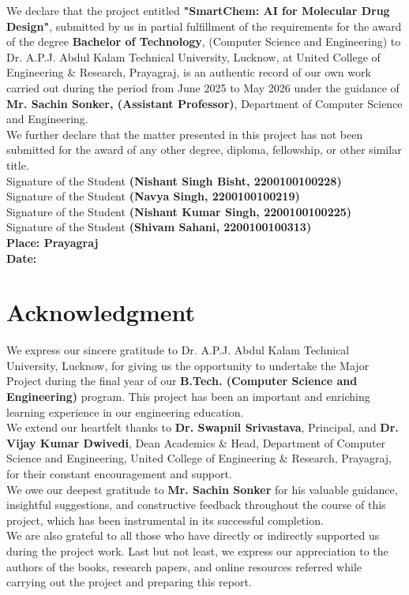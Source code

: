 \documentclass[12pt,a4paper]{report}
\begin{document}
We declare that the project entitled \textbf{"SmartChem: AI for Molecular Drug Design"}, submitted by us in partial fulfillment of the requirements for the award of the degree \textbf{Bachelor of Technology}, (Computer Science and Engineering) to Dr. A.P.J. Abdul Kalam Technical University, Lucknow, at United College of Engineering \& Research, Prayagraj, is an authentic record of our own work carried out during the period from June 2025 to May 2026 under the guidance of \textbf{Mr. Sachin Sonker, (Assistant Professor)}, Department of Computer Science and Engineering.\\[0.5cm] 
We further declare that the matter presented in this project has not been submitted for the award of any other degree, diploma, fellowship, or other similar title.\\[1cm]
Signature of the Student \textbf{(Nishant Singh Bisht, 2200100100228)}\\[0.8cm]Signature of the Student
\textbf{(Navya Singh, 2200100100219)}\\[0.8cm]Signature of the Student \textbf{(Nishant Kumar Singh, 2200100100225)}\\[0.8cm]Signature of the Student \textbf{(Shivam Sahani, 2200100100313)}\\[4cm]\textbf{Place: Prayagraj\\Date:}


\chapter*{Acknowledgment}
We express our sincere gratitude to Dr. A.P.J. Abdul Kalam Technical University, Lucknow, for giving us the opportunity to undertake the Major Project during the final year of our \textbf{B.Tech. (Computer Science and Engineering)} program. This project has been an important and enriching learning experience in our engineering education.\\We extend our heartfelt thanks to \textbf{Dr. Swapnil Srivastava}, Principal, and \textbf{Dr. Vijay Kumar Dwivedi}, Dean Academics \& Head, Department of Computer Science and Engineering, United College of Engineering \& Research, Prayagraj, for their constant encouragement and support.\\We owe our deepest gratitude to \textbf{Mr. Sachin Sonker} for his valuable guidance, insightful suggestions, and constructive feedback throughout the course of this project, which has been instrumental in its successful completion.\\We are also grateful to all those who have directly or indirectly supported us during the project work. Last but not least, we express our appreciation to the authors of the books, research papers, and online resources referred while carrying out the project and preparing this report.
\end{document}
